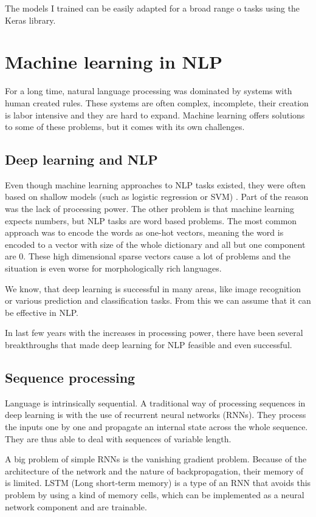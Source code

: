 \documentclass[
  digital, %
  table,   %
  twoside, %
  lof,     %
  lot,     %
]{fithesis3}
\begin{document}
The models I trained can be easily adapted for a broad range o tasks using the Keras library.


\chapter{Machine learning in NLP}
For a long time, natural language processing was dominated by systems with human created rules. These systems are often complex, incomplete, their creation is labor intensive and they are hard to expand. Machine learning offers solutions to some of these problems, but it comes with its own challenges.
\section{Deep learning and NLP}
Even though machine learning approaches to NLP tasks existed, they were often based on shallow models (such as logistic regression or SVM) \parencite{deepNLP}. Part of the reason was the lack of processing power. The other problem is that machine learning expects numbers, but NLP tasks are word based problems. The most common approach was to encode the words as one-hot vectors, meaning the word is encoded to a vector with size of the whole dictionary and all but one component are 0.  These high dimensional sparse vectors cause a lot of problems and the situation is even worse for morphologically rich languages.

We know, that deep learning is successful in many areas, like image recognition or various prediction and classification tasks. From this we can assume that it can be effective in NLP.

In last few years with the increases in processing power, there have been several breakthroughs that made deep learning for NLP feasible and even successful.

\section{Sequence processing}
Language is intrinsically sequential. A traditional way of processing sequences in deep learning is with the use of recurrent neural networks (RNNs). They process the inputs one by one and propagate an internal state across the whole sequence. They are thus able to deal with sequences of variable length. 

A big problem of simple RNNs is the vanishing gradient problem. Because of the architecture of the network and the nature of backpropagation, their memory of is limited. LSTM (Long short-term memory) is a type of an RNN that avoids this problem by using a kind of memory cells, which can be implemented as a neural network component and are trainable.
\end{document}
